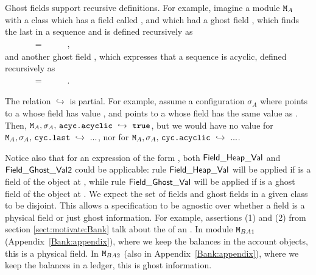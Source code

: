 Ghost fields support recursive definitions. For example, imagine a module ${\mbox{\tt{\ensuremath{{\mbox{\tt{M}}}}}}}_A$ with
a class  which has a field called , and which 
had a ghost field , which finds  the last  in a sequence
and is defined recursively as \\
$~ \strut \hspace{.1cm}$ \ \ \ \ \ =\   \  \  \ ,\\
and another ghost field , which expresses that a sequence is acyclic,
defined recursively as \\
$~ \strut \hspace{.1cm}$ \ \ \ \ \ =\   \  \  \ .

The relation $ \hookrightarrow$ is partial. 
For example, assume   a configuration
$\sigma_A$ where
 points to a  whose field  has value , and   
 points to a  whose field  has the same value as . Then,   
$\M_A,\sigma_A,\,\prg{acyc.acyclic}  \ \hookrightarrow\  \prg{true}$, but we would have no value for 
$\M_A,\sigma_A,\, \prg{cyc.last}  \ \hookrightarrow\  ...$, nor for
$\M_A,\sigma_A,\, \prg{cyc.acyclic}  \ \hookrightarrow\  ...$.

Notice also that for an expression of the form  
, both ${\sf {Field\_Heap\_Val}}$ and ${\sf {Field\_Ghost\_Val2}}$ could be applicable: rule ${\sf {Field\_Heap\_Val}}$
will be applied if  is a field of the object at , while rule ${\sf {Field\_Ghost\_Val}}$
will be applied if  is a ghost field of the object at . We expect the set of fields and ghost fields in a 
given class to be disjoint.
This allows a specification to be agnostic over whether a field is a physical field or just ghost information.
For example, assertions (1) and (2) from  section  \ref{sect:motivate:Bank}
 talk about the  of an . 
In module ${\mbox{\tt{\ensuremath{{\mbox{\tt{M}}}}}}}_{BA1}$ (Appendix~\ref{Bank:appendix}), where we keep the balances in the account objects, this is a physical field. 
In ${\mbox{\tt{\ensuremath{{\mbox{\tt{M}}}}}}}_{BA2}$ (also in Appendix~\ref{Bank:appendix}), where we keep the
balances in a ledger, this is ghost information.  

